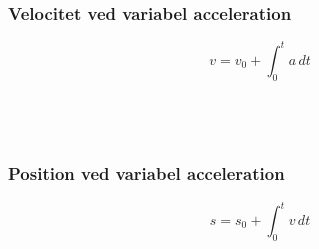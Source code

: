 	\subsubsection{Velocitet ved variabel acceleration}
		\begin{equation}
			v=v_0+\int_0^ta\,dt
		\end{equation}
		\vel\\
		\velbeg\\
		\acc\\
		\tid
	
	\subsubsection{Position ved variabel acceleration}
		\begin{equation}
			s=s_0+\int_0^tv\,dt
		\end{equation}
		\strek\\
		\strekbeg\\
		\vel\\
		\tid
		
